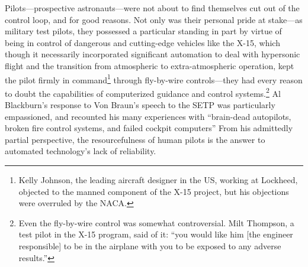 Pilots---prospective astronauts---were not about to find themselves
cut out of the control loop, and for good reasons. Not only was their
personal pride at stake---as military test pilots, they possessed a
particular standing in part by virtue of being in control of dangerous
and cutting-edge vehicles like the X-15, which though it necessarily
incorporated significant automation to deal with hypersonic flight and
the transition from atmospheric to extra-atmospheric operation, kept
the pilot firmly in command\footnote{Kelly Johnson, the leading aircraft
designer in the US, working at Lockheed, objected to the manned
component of the X-15
project, but his objections were overruled by the NACA.\cite[p.
  46]{???-DM}} through fly-by-wire controls\cite{???}---they had 
every reason to doubt the capabilities of computerized guidance and
control systems.\footnote{Even the fly-by-wire control was somewhat
  controversial. Milt Thompson, a test pilot in the X-15 program, said
  of it: ``you would like him [the engineer responsible] to be in the
airplane with you to be exposed to any adverse results.''\cite[p.
  55]{???-DM}} Al Blackburn's response to Von Braun's speech to the
SETP was particularly empassioned, and recounted his many experiences with
``brain-dead autopilots, broken fire control systems, and failed cockpit
computers''\cite[p. 68]{???-DM} From
his admittedly partial perspective, the resourcefulness of human
pilots is the answer to automated technology's lack of reliability.

